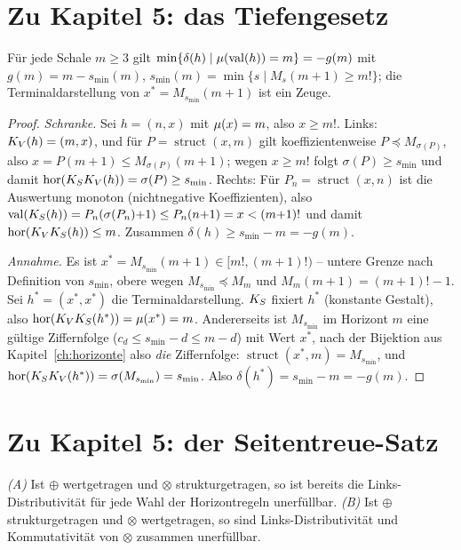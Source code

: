 \section*{Zu Kapitel 5: das Tiefengesetz}

\begin{satz}
Für jede Schale $m\ge3$ gilt
$\min\{\delta(h)\mid\mu(\operatorname{val}(h))=m\}=-g(m)$ mit
$g(m)=m-s_{\min}(m)$,
$s_{\min}(m)=\min\{s\mid M_s(m{+}1)\ge m!\}$; die
Terminaldarstellung von $x^*=M_{s_{\min}}(m{+}1)$ ist ein Zeuge.
\end{satz}

\begin{proof}
\emph{Schranke.} Sei $h=(n,x)$ mit $\mu(x)=m$, also $x\ge m!$.
Links: $K_V(h)=(m,x)$, und für $P=\operatorname{struct}(x,m)$ gilt
koeffizientenweise $P\preceq M_{\sigma(P)}$, also
$x=P(m{+}1)\le M_{\sigma(P)}(m{+}1)$; wegen $x\ge m!$ folgt
$\sigma(P)\ge s_{\min}$ und damit
$\operatorname{hor}(K_SK_V(h))=\sigma(P)\ge s_{\min}$. Rechts: Für
$P_n=\operatorname{struct}(x,n)$ ist die Auswertung monoton
(nichtnegative Koeffizienten), also
$\operatorname{val}(K_S(h))=P_n(\sigma(P_n){+}1)\le P_n(n{+}1)=x<(m{+}1)!$ und
damit $\operatorname{hor}(K_VK_S(h))\le m$. Zusammen
$\delta(h)\ge s_{\min}-m=-g(m)$.

\emph{Annahme.} Es ist $x^*=M_{s_{\min}}(m{+}1)\in[m!,(m{+}1)!)$
-- untere Grenze nach Definition von $s_{\min}$, obere wegen
$M_{s_{\min}}\preceq M_m$ und $M_m(m{+}1)=(m{+}1)!-1$. Sei
$h^*=(x^*,x^*)$ die Terminaldarstellung. $K_S$ fixiert $h^*$
(konstante Gestalt), also
$\operatorname{hor}(K_VK_S(h^*))=\mu(x^*)=m$. Andererseits ist $M_{s_{\min}}$
im Horizont $m$ eine gültige Ziffernfolge
($c_d\le s_{\min}-d\le m-d$) mit Wert $x^*$, nach der Bijektion
aus Kapitel~\ref{ch:horizonte} also \emph{die} Ziffernfolge:
$\operatorname{struct}(x^*,m)=M_{s_{\min}}$, und
$\operatorname{hor}(K_SK_V(h^*))=\sigma(M_{s_{\min}})=s_{\min}$. Also
$\delta(h^*)=s_{\min}-m=-g(m)$.
\end{proof}

\section*{Zu Kapitel 5: der Seitentreue-Satz}

\begin{satz}
\emph{(A)} Ist $\oplus$ wertgetragen und $\otimes$ strukturgetragen,
so ist bereits die Links-Distributivität für jede Wahl der
Horizontregeln unerfüllbar. \emph{(B)} Ist $\oplus$ strukturgetragen
und $\otimes$ wertgetragen, so sind Links-Distributivität und
Kommutativität von $\otimes$ zusammen unerfüllbar.
\end{satz}

